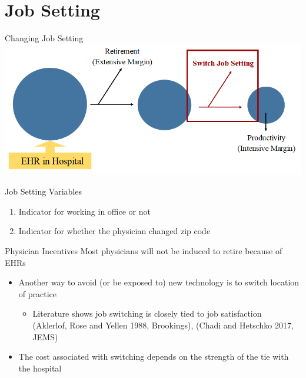 \documentclass[10pt]{beamer}
\begin{document}
\section{Job Setting}




\begin{frame}{Changing Job Setting}
\centering
\includegraphics[scale=.5]{Objects/EHR_FlowChart_JobSwitch.PNG}
\end{frame}

\begin{frame}{Job Setting Variables}
\begin{enumerate}
    \item Indicator for working in office or not
                    \vspace{3mm}
    \item Indicator for whether the physician changed zip code
\end{enumerate}
\end{frame}



\begin{frame}{Physician Incentives}
Most physicians will not be induced to retire because of EHRs
\begin{itemize}
    \item Another way to avoid (or be exposed to) new technology is to switch location of practice
    \begin{itemize}
                \vspace{3mm}
        \item Literature shows job switching is closely tied to job satisfaction\\ \scriptsize (Aklerlof, Rose and Yellen 1988, Brookings), (Chadi and Hetschko 2017, JEMS)
    \end{itemize}
                \vspace{6mm}
                \pause
    \item The cost associated with switching depends on the strength of the tie with the hospital
    \end{itemize}
\end{frame}
\end{document}
